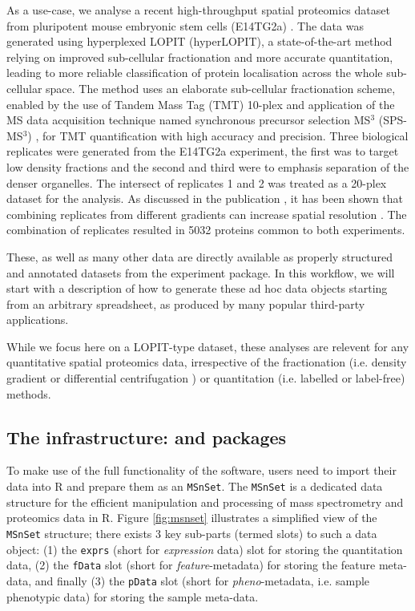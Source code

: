 As a use-case, we analyse a recent high-throughput spatial proteomics
dataset from pluripotent mouse embryonic stem cells (E14TG2a)
\cite{hyper}. The data was generated using hyperplexed LOPIT
(hyperLOPIT), a state-of-the-art method relying on improved
sub-cellular fractionation and more accurate quantitation, leading to
more reliable classification of protein localisation across the whole
sub-cellular space. The method uses an elaborate sub-cellular
fractionation scheme, enabled by the use of Tandem Mass Tag (TMT)
\cite{Thompson:2003} 10-plex and application of the MS data
acquisition technique named synchronous precursor selection MS$^3$
(SPS-MS$^3$) \cite{McAlister:2014}, for TMT quantification with high
accuracy and precision. Three biological replicates were generated
from the E14TG2a experiment, the first was to target low density
fractions and the second and third were to emphasis separation of the
denser organelles.  The intersect of replicates 1 and 2 was treated as
a 20-plex dataset for the analysis.  As discussed in the publication
\cite{hyper}, it has been shown that combining replicates from
different gradients can increase spatial resolution
\cite{Trotter:2010}. The combination of replicates resulted in 5032
proteins common to both experiments.

These, as well as many other data are directly available as properly
structured and annotated datasets from the 
experiment package. In this workflow, we will start with a description
of how to generate these ad hoc data objects starting from an
arbitrary spreadsheet, as produced by many popular third-party
applications.

While we focus here on a LOPIT-type dataset, these analyses are
relevent for any quantitative spatial proteomics data,
irrespective of the fractionation (i.e. density gradient or
differential centrifugation \cite{Itzhak:2016}) or quantitation
(i.e. labelled or label-free) methods.

\subsection*{The infrastructure:  and  packages}

To make use of the full functionality of the  software,
users need to import their data into R and prepare them as an
\texttt{MSnSet}. The \texttt{MSnSet} is a dedicated data structure for
the efficient manipulation and processing of mass spectrometry and
proteomics data in R. Figure \ref{fig:msnset} illustrates a simplified view of the
\texttt{MSnSet} structure; there exists 3 key sub-parts (termed slots)
to such a data object: (1) the \texttt{exprs} (short for
\textit{expression} data) slot for storing the quantitation data, (2)
the \texttt{fData} slot (short for \textit{feature}-metadata) for
storing the feature meta-data, and finally (3) the \texttt{pData} slot
(short for \textit{pheno}-metadata, i.e. sample phenotypic data) for
storing the sample meta-data.

